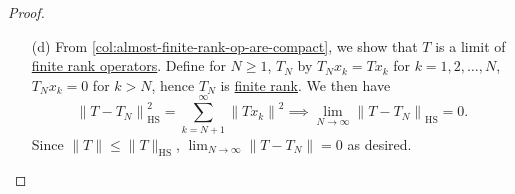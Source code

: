 \begin{proof}
\begin{enumerate}
		\item[(d)] From \autoref{col:almost-finite-rank-op-are-compact}, we show that \(T\) is a limit of \hyperref[rmk:finite-rank-op]{finite rank operators}. Define for \(N \geq 1\), \(T_N\) by \(T_N x_k = Tx_k\) for \(k = 1, 2, \ldots  , N\), \(T_{N}x_k = 0 \) for \(k > N\), hence \(T_N\) is \hyperref[rmk:finite-rank-op]{finite rank}. We then have
			\[
				\left\lVert T - T_{N} \right\rVert ^{2} _{\mathrm{HS} }= \sum_{k=N+1}^{\infty} \left\lVert T x_{k} \right\rVert ^{2}
				\implies \lim_{N \to \infty} \left\lVert T - T_{N} \right\rVert _{\mathrm{HS} }= 0.
			\]
			Since \(\lVert T \rVert \leq \lVert T \rVert _{\mathrm{HS} }\), \(\lim_{N \to \infty} \left\lVert T - T_N\right\rVert = 0\) as desired.
	\end{enumerate}
\end{proof}

